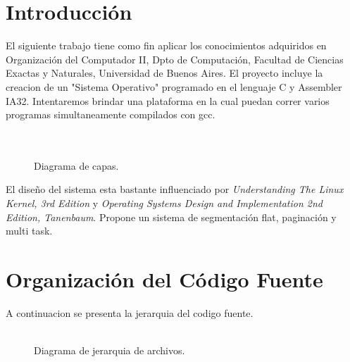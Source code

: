 \documentclass[a4paper,10pt]{article}
\begin{document}
\newpage
\tableofcontents
\newpage



\section{Introducci\'on}
El siguiente trabajo tiene como fin aplicar los conocimientos adquiridos en Organización del Computador II, Dpto de Computación, Facultad de Ciencias Exactas y Naturales, Universidad de Buenos Aires.	El proyecto incluye la creacion de un "Sistema Operativo" programado en el lenguaje C y Assembler IA32. Intentaremos brindar una plataforma en la cual puedan correr varios programas simultaneamente compilados con gcc.
\\
\\
\\
\begin{figure}[H]
\centering
{}
\caption{Diagrama de capas.}
\end{figure}

El diseño del sistema esta bastante influenciado por \emph{Understanding The Linux Kernel, 3rd Edition} y \emph{Operating Systems Design and Implementation 2nd Edition, Tanenbaum}. Propone un sistema de segmentación flat, paginación y multi task.

\newpage
\section{Organizaci\'on del C\'odigo Fuente}
A continuacion se presenta la jerarquia del codigo fuente.
\\
\\
\begin{figure}[H]
\centering
{}
\caption{Diagrama de jerarquia de archivos.}
\end{figure}
\end{document}
